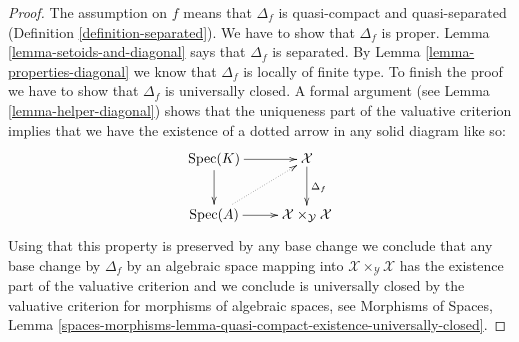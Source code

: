 \documentclass[10pt,a4paper]{amsart}
\theoremstyle{plain}
\theoremstyle{definition}
\theoremstyle{remark}
\numberwithin{equation}{subsection}
\def\Spec{\mathop{\mathrm{Spec}}}
\begin{document}
\begin{proof}
The assumption on $f$ means that $\Delta_f$ is quasi-compact
and quasi-separated (Definition \ref{definition-separated}).
We have to show that $\Delta_f$ is proper.
Lemma \ref{lemma-setoids-and-diagonal} says that $\Delta_f$
is separated. By Lemma \ref{lemma-properties-diagonal}
we know that $\Delta_f$ is locally of finite type.
To finish the proof we have to show that
$\Delta_f$ is universally closed. A formal argument
(see Lemma \ref{lemma-helper-diagonal}) shows that
the uniqueness part of the valuative criterion implies
that we have the existence of a dotted arrow in any solid diagram like so:
$$
\xymatrix{
\Spec(K) \ar[d] \ar[r] & \mathcal{X} \ar[d]^{\Delta_f} \\
\Spec(A) \ar[r] \ar@{..>}[ru] & \mathcal{X} \times_\mathcal{Y} \mathcal{X}
}
$$
Using that this property is preserved by any base change
we conclude that any base change by $\Delta_f$ by an algebraic
space mapping into $\mathcal{X} \times_\mathcal{Y} \mathcal{X}$
has the existence part of the valuative criterion and
we conclude is universally closed by the valuative criterion
for morphisms of algebraic spaces, see
Morphisms of Spaces, Lemma
\ref{spaces-morphisms-lemma-quasi-compact-existence-universally-closed}.
\end{proof}
\end{document}
